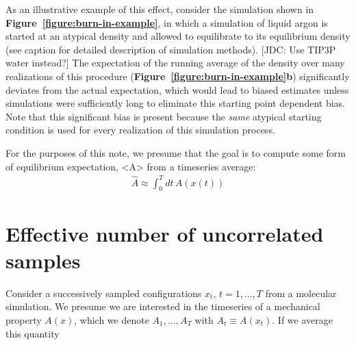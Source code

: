 \documentclass[aps,pre,twocolumn,nofootinbib,superscriptaddress,linenumbers,11point]{revtex4-1}
\begin{document}
As an illustrative example of this effect, consider the simulation shown in {\bf Figure~\ref{figure:burn-in-example}}, in which a simulation of liquid argon is started at an atypical density and allowed to equilibrate to its equilibrium density (see caption for detailed description of simulation methods).
{\color{red}[JDC: Use TIP3P water instead?]}
The expectation of the running average of the density over many realizations of this procedure ({\bf Figure~\ref{figure:burn-in-example}b}) significantly deviates from the actual expectation, which would lead to biased estimates unless simulations were sufficiently long to eliminate this starting point dependent bias.
Note that this significant bias is present because the \emph{same} atypical starting condition is used for every realization of this simulation process.

For the purposes of this note, we presume that the goal is to compute some form of equilibrium expectation, <A> from a timeseries average:
\begin{eqnarray}
\hat{A} \approx \int_0^T dt \, A(x(t))
\end{eqnarray}


\begin{figure*} 
\caption{\label{figure:burn-in-example} {\bf Illustration of the motivation for discarding data to equilibration in computing expectations from molecular simulations.} 
This is text.}
\end{figure*}


\section*{Effective number of uncorrelated samples}
\label{section:statistical-inefficiency}

Consider a successively sampled configurations $x_t$, $t = 1, \ldots, T$ from a molecular simulation.
We presume we are interested in the timeseries of a mechanical property $A(x)$, which we denote $A_1, \ldots, A_T$ with $A_t \equiv A(x_t)$.
If we average this quantity 
\end{document}
